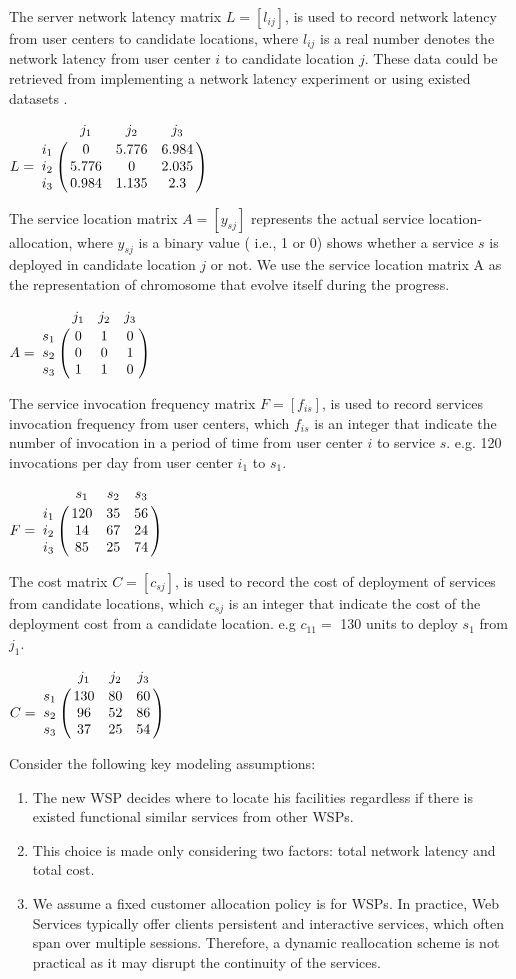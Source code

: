 \documentclass{llncs}
\let\bbordermatrix\bordermatrix
\begin{document}
The server network latency matrix $L = [l_{ij}]$, is used to record network latency from user centers to 
candidate locations, where $l_{ij}$ is a real number denotes the network latency from user center $i$ to candidate 
location $j$. 
These data could be retrieved from implementing a network latency experiment or using existed datasets \cite{5552800} \cite{6076756}.
\begin{center}
$
L = \bbordermatrix{~ & j_{1} & j_{2} & j_{3} \cr
					i_{1}	&0 &5.776 &6.984	\cr
					i_{2}	&5.776  &0 &2.035 \cr
					i_{3}	&0.984 &1.135	&2.3 \cr} 
$
\end{center}
The service location matrix $A = [y_{sj}]$ represents the actual service location-allocation, where $y_{sj}$  is a binary value ( i.e., 1 or 0) shows whether a service $s$ is deployed in candidate location $j$ or not.
We use the service location matrix A as the representation of chromosome that evolve itself during the progress.
\begin{center}
$
A = \bbordermatrix{~ & j_{1} & j_{2} & j_{3}\cr
					s_{1}	&0 &1 &0	\cr
					s_{2}	&0  &0 &1	\cr
					s_{3}	&1 &1 &0	\cr} 
$
\end{center}

The service invocation frequency matrix $F= [f_{is}]$, is used to record services invocation frequency from user centers, 
which $f_{is}$ is an integer that indicate the number of invocation in a period of time from user center $i$ to service $s$. 
e.g. 120 invocations per day from user center $i_{1}$ to $s_{1}$.
\begin{center}
$
F = \bbordermatrix{~ & s_{1} & s_{2} & s_{3}  \cr
					i_{1}	&120 &35 &56	\cr
					i_{2}	&14  &67 &24 \cr
					i_{3}	&85 &25 &74 \cr} 
$
\end{center}

The cost matrix $C = [c_{sj}]$, is used to record the cost of deployment of services from candidate locations, 
which $c_{sj}$ is an integer that indicate the cost of the deployment cost from a candidate location. 
e.g $c_{11} = $ 130 units to deploy $s_{1}$ from $j_{1}$.
\begin{center}
$
C = \bbordermatrix{~ & j_{1} & j_{2} & j_{3}\cr
					s_{1}	&130 &80 &60\cr
					s_{2}	&96  &52 &86\cr
					s_{3}	&37 &25 &54\cr} 
$
\end{center}

Consider the following key modeling assumptions:
\begin{enumerate}
	\item The new WSP decides where to locate his facilities regardless if there is existed functional similar services from other WSPs.
	\item This choice is made only considering two factors: total network latency and total cost.
	\item We assume a fixed customer allocation policy is for WSPs. In practice, Web Services typically offer clients persistent and interactive services, which often span over multiple sessions. Therefore, a dynamic reallocation scheme is not practical as it may disrupt the continuity of the services.
\end{enumerate}
\end{document}
